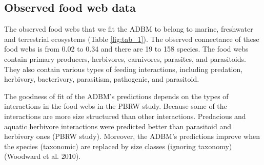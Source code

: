 \documentclass{article}
\begin{document}
\begin{table}

\caption{\label{tab:unnamed-chunk-2}\label{fig:tab_2}Traits with their allometric function and corresponding parameters in ADBM.}
\centering
{}
\end{table}

\hypertarget{observed-food-web-data}{%
\subsection{Observed food web data}\label{observed-food-web-data}}

The observed food webs that we fit the ADBM to belong to marine,
freshwater and terrestrial ecosystems (Table \ref{fig:tab_1}). The
observed connectance of these food webs is from 0.02 to 0.34 and there
are 19 to 158 species. The food webs contain primary producers,
herbivores, carnivores, parasites, and parasitoids. They also contain
various types of feeding interactions, including predation, herbivory,
bacterivory, parasitism, pathogenic, and parasitoid.

The goodness of fit of the ADBM's predictions depends on the types of
interactions in the food webs in the PBRW study. Because some of the
interactions are more size structured than other interactions.
Predacious and aquatic herbivore interactions were predicted better than
parasitoid and herbivory ones (PBRW study). Moreover, the ADBM's
predictions improve when the species (taxonomic) are replaced by size
classes (ignoring taxonomy) (Woodward et al. 2010).
\end{document}
